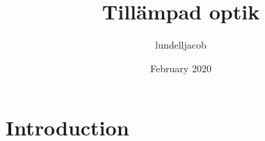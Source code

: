 \documentclass{article}
\title{Tillämpad optik}
\author{lundelljacob }
\date{February 2020}
\begin{document}
\maketitle

\section{Introduction}
\end{document}
